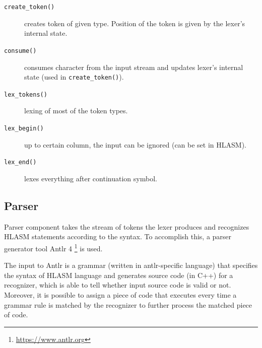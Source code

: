 \begin{description}
\begin{description}
			\item[\texttt{create\_token()}] creates token of given type. Position of the token is given by the lexer's internal state. 
			
			\item[\texttt{consume()}] consumes character from the input stream and updates lexer's internal state (used in \texttt{create\_token()}).
			
			\item[\texttt{lex\_tokens()}] lexing of most of the token types.
			
			\item[\texttt{lex\_begin()}] up to certain column, the input can be ignored (can be set in HLASM).
			
			\item[\texttt{lex\_end()}] lexes everything after continuation symbol.
			
			
		\end{description}
		
\end{description}


\subsection{Parser}

Parser component takes the stream of tokens the lexer produces and recognizes HLASM statements according to the syntax. To accomplish this, a parser generator tool Antlr 4 \footnote{\url{https://www.antlr.org}} is used.

The input to Antlr is a grammar (written in antlr-specific language) that specifies the syntax of HLASM language and generates source code (in C++) for a recognizer, which is able to tell whether input source code is valid or not. Moreover, it is possible to assign a piece of code that executes every time a grammar rule is matched by the recognizer to further process the matched piece of code.
